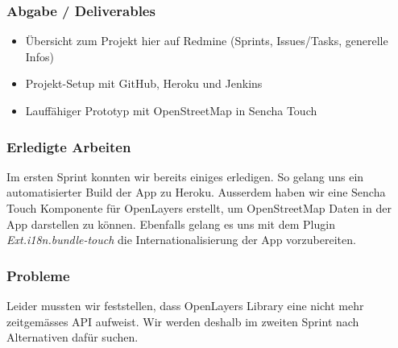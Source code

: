 \subsubsection{Abgabe / Deliverables}

\begin{itemize}
	\item Übersicht zum Projekt hier auf Redmine (Sprints, Issues/Tasks, generelle Infos)
	\item Projekt-Setup mit GitHub, Heroku und Jenkins
	\item Lauffähiger Prototyp mit \gls{OpenStreetMap} in Sencha Touch
\end{itemize}

\subsubsection{Erledigte Arbeiten}
Im ersten Sprint konnten wir bereits einiges erledigen. So gelang uns ein automatisierter Build der App zu Heroku. Ausserdem haben wir eine Sencha Touch Komponente für OpenLayers erstellt, um \gls{OpenStreetMap} Daten in der App darstellen zu können. Ebenfalls gelang es uns mit dem Plugin \emph{Ext.i18n.bundle-touch} die Internationalisierung der App vorzubereiten.

\subsubsection{Probleme}
Leider mussten wir feststellen, dass OpenLayers Library eine nicht mehr zeitgemässes \gls{API} aufweist. Wir werden deshalb im zweiten Sprint nach Alternativen dafür suchen.